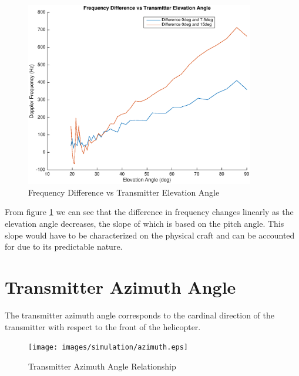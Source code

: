 \begin{figure}
	\begin{center}
		\includegraphics[width=10cm]{images/simulation/elevation_angle_with_pitch_max_doppler_Difference.eps}
		\caption{Frequency Difference vs Transmitter Elevation Angle}
		\label{fig:pitch_tx_elevation_angle_difference}
	\end{center}
\end{figure}

From figure \ref{fig:pitch_tx_elevation_angle_difference} we can see that the difference in frequency changes linearly as the elevation angle decreases, the slope of which is based on the pitch angle. This slope would have to be characterized on the physical craft and can be accounted for due to its predictable nature.

\section{Transmitter Azimuth Angle} \label{taa}
The transmitter azimuth angle corresponds to the cardinal direction of the transmitter with respect to the front of the helicopter.

\begin{figure}
	\begin{center}
		\texttt{[image: images/simulation/azimuth.eps]}
		\caption{Transmitter Azimuth Angle Relationship}
		\label{fig:tx_azimuth_rel}
	\end{center}
\end{figure}

